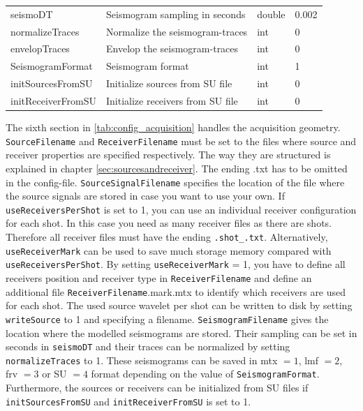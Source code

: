 \documentclass[pdftex,a4paper,parskip,listof=totoc,bibliography=totoc,onehalfspacing,12pt]{scrreprt}
\newcommand{\shellcmd}[1]{\indent\indent\texttt{#1}}	%
\begin{document}
\begin{table}[h!]
\begin{adjustbox}{width=1\textwidth,center=\textwidth}
\begin{tabular}{llll}
	seismoDT & Seismogram sampling in seconds & double & \num{0.002} \\
	normalizeTraces & Normalize the seismogram-traces & int & \num{0}\\
	envelopTraces & Envelop the seismogram-traces & int & \num{0}\\
	SeismogramFormat & Seismogram format & int & \num{1}\\
	initSourcesFromSU & Initialize sources from SU file & int & \num{0}\\
	initReceiverFromSU & Initialize receivers from SU file & int & \num{0}\\
	\bottomrule
\end{tabular}
\end{adjustbox}
\end{table}
The sixth section in \ref{tab:config_acquisition} handles the acquisition geometry. \verb+SourceFilename+ and \verb+ReceiverFilename+ must be set to the files where source and receiver properties are specified respectively. The way they are structured is explained in chapter \ref{sec:sourcesandreceiver}. The ending .txt has to be omitted in the config-file. 
\verb+SourceSignalFilename+ specifies the location of the file where the source signals are stored in case you want to use your own.
If \verb+useReceiversPerShot+ is set to 1, you can use an individual receiver configuration for each shot. In this case you need as many receiver files as there are shots. Therefore all receiver files must have the ending \shellcmd{.shot\_<shot number>.txt}. 
Alternatively, \verb+useReceiverMark+ can be used to save much storage memory compared with \verb+useReceiversPerShot+.
By setting \verb+useReceiverMark+ = 1, you have to define all receivers position and receiver type in \verb+ReceiverFilename+ and define an additional file \verb+ReceiverFilename+.mark.mtx to identify which receivers are used for each shot.
The used source wavelet per shot can be written to disk by setting \verb+writeSource+ to 1 and specifying a filename.
\verb+SeismogramFilename+ gives the location where the modelled seismograms are stored. Their sampling can be set in seconds in \verb+seismoDT+ and their traces can be normalized by setting \verb+normalizeTraces+ to 1.
These seismograms can be saved in mtx $=1$, lmf $=2$, frv $=3$ or SU $=4$ format depending on the value of \verb+SeismogramFormat+.  
Furthermore, the sources or receivers can be initialized from SU files if \verb+initSourcesFromSU+ and \verb+initReceiverFromSU+ is set to 1.
\end{document}
